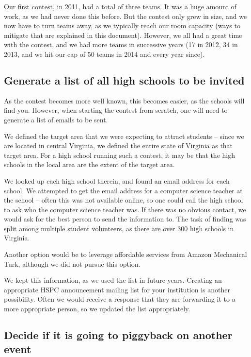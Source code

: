 \documentclass[11pt,twoside,letterpaper]{book}
\begin{document}
Our first contest, in 2011, had a total of three teams.  It was a huge
amount of work, as we had never done this before.  But the contest
only grew in size, and we now have to turn teams away, as we typically
reach our room capacity (ways to mitigate that are explained in this
document).  However, we all had a great time with the contest, and we
had more teams in successive years (17 in 2012, 34 in 2013, and
we hit our cap of 50 teams in 2014 and every year since).


\subsection*{Generate a list of all high schools to be invited}

As the contest becomes more well known, this becomes easier, as the
schools will find you.  However, when starting the contest from
scratch, one will need to generate a list of emails to be sent.

We defined the target area that we were expecting to attract students
-- since we are located in central Virginia, we defined the entire
state of Virginia as that target area.  For a high school running such
a contest, it may be that the high schools in the local area are the
extent of the target area.

We looked up each high school therein, and found an email address for
each school.  We attempted to get the email address for a computer
science teacher at the school -- often this was not available online,
so one could call the high school to ask who the computer science
teacher was.  If there was no obvious contact, we would ask for the
best person to send the information to.  The task of finding was split
among multiple student volunteers, as there are over 300 high schools
in Virginia.

Another option would be to leverage affordable services from
Amazon Mechanical Turk, although we did not pursue this option.

We kept this information, as we used the list in future years.
Creating an appropriate HSPC announcement mailing list for your
institution is another possibility.  Often we would receive a
response that they are forwarding it to a more appropriate person, so
we updated the list appropriately.


\subsection*{Decide if it is going to piggyback on another event}
\end{document}
